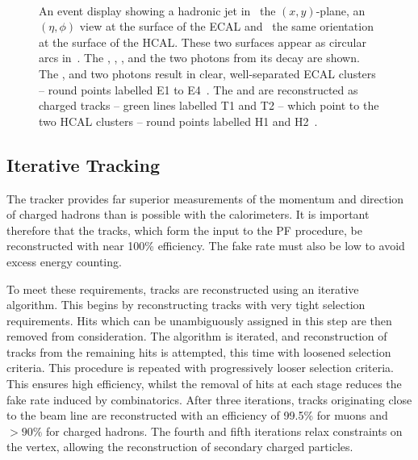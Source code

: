 \begin{figure}[h!]
\centering
{}\\
\quad
{}
\caption[\acl{PF} event display showing a hadronic jet]{An event display showing
  a hadronic jet in~ the $(x,y)$-plane,
   an $(\eta,\phi)$ view at the surface of the
  \ac{ECAL} and~ the same orientation at the surface
  of the \ac{HCAL}. These two surfaces appear as circular arcs
  in~. The \PKlong, \Ppiminus, \Ppiplus, \Ppizero and
  the two photons from its decay are shown. The \PKlong, \Ppiminus and two
  photons result in clear, well-separated \ac{ECAL} clusters -- round points
  labelled E1 to E4~. The \Ppiplus and \Ppiminus are
  reconstructed as charged tracks -- green lines labelled T1 and T2 -- which
  point to the two \ac{HCAL} clusters -- round points labelled H1 and
  H2~\cite{cms_pf_pas}.}
\label{fig:reco_pf_diag}
\end{figure}

\subsection{Iterative Tracking}
The tracker provides far superior measurements of the momentum and direction of
charged hadrons than is possible with the calorimeters. It is important
therefore that the tracks, which form the input to the \ac{PF} procedure, be
reconstructed with near 100\% efficiency. The fake rate must also be low to
avoid excess energy counting.

To meet these requirements, tracks are reconstructed using an iterative
algorithm. This begins by reconstructing tracks with very tight selection
requirements. Hits which can be unambiguously assigned in this step are then
removed from consideration. The algorithm is iterated, and reconstruction of
tracks from the remaining hits is attempted, this time with loosened selection
criteria. This procedure is repeated with progressively looser selection
criteria. This ensures high efficiency, whilst the removal of hits at each stage
reduces the fake rate induced by combinatorics.  After three iterations, tracks
originating close to the beam line are reconstructed with an efficiency of
99.5\% for muons and $>90\%$ for charged hadrons. The fourth and fifth
iterations relax constraints on the vertex, allowing the reconstruction of
secondary charged particles.

